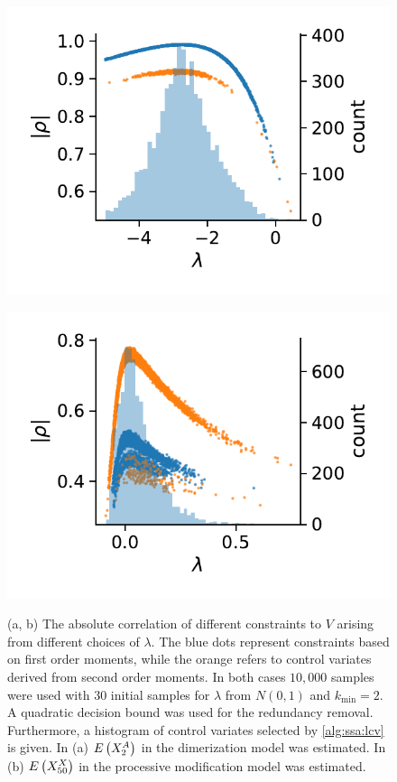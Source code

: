 \begin{figure}
    \begin{minipage}{.45\textwidth}
    \centering
    \includegraphics[scale=0.6]{gfx/cs_bdim.pdf}\\
    \end{minipage}
    \hspace{1em}
    \begin{minipage}{.45\textwidth}
    \centering
    \includegraphics[scale=0.6]{gfx/cs_pm.pdf}\\
    \end{minipage}
	\caption[\ac{CV} correlation charactersitics]{(a, b) The absolute correlation of different constraints {to $V$}
    arising from different choices of $\lambda$. The blue dots represent constraints
    based on first order moments, while the orange refers to control  variates derived from second
    order moments. In both cases $10,\!000$ samples were used with
    30 initial samples for $\lambda$ from $N(0,1)$ and $k_{\min}=2$. A quadratic decision bound was used for
    the redundancy removal. Furthermore, a histogram of control  variates selected by \autoref{alg:ssa:lcv}
    is given.
    In (a) ${E}\left(X^A_2\right)$ in the dimerization model was estimated.
    In (b) ${E}\left(X^X_{50}\right)$ in the processive modification model was estimated.
    }
    \label{fig:bdim}
\end{figure}

